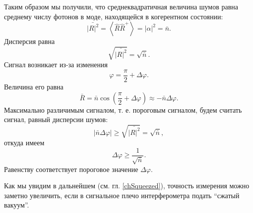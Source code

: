 Таким образом мы получили, что среднеквадратичная величина шумов равна
среднему числу фотонов в моде, находящейся в когерентном состоянии:
\begin{equation}
\bar{\left|R\right|^2} = 
\left<\hat{R}\hat{R}^{+}\right> = 
\left|\alpha\right|^2 =
\bar{n}.
\nonumber
\end{equation}
Дисперсия равна
\begin{equation}
\sqrt{\bar{\left|R\right|^2}} = 
\sqrt{\bar{n}}.
\nonumber
\end{equation}
Сигнал возникает из-за изменения 
\[
\varphi = \frac{\pi}{2} + \Delta \varphi.
\]
Величина его равна
\[
\bar{R} = \bar{n} \cos\left(\frac{\pi}{2} + \Delta \varphi\right) \approx
- \bar{n} \Delta \varphi.
\]
Максимально различимым сигналом, т. е. пороговым сигналом, будем
считать сигнал, равный дисперсии шумов:
\[
\left|\bar{n} \Delta \varphi\right| \ge
\sqrt{\bar{\left|R\right|^2}} = 
\sqrt{\bar{n}},
\]
откуда имеем
\[
\Delta \varphi  \ge \frac{1}{\sqrt{\bar{n}}}.
\]
Равенству соответствует пороговое значение $\Delta \varphi$.

Как мы увидим в дальнейшем (см. гл. \ref{chSqueezed}), точность измерения
можно заметно увеличить, если в сигнальное плечо интерферометра подать
``сжатый вакуум''.  


